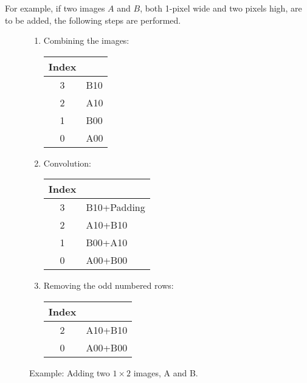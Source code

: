 \documentclass[12pt]{report}
\def\byX {\!\!\times\!\!}
\begin{document}
For example, if two images $A$ and $B$, both 1-pixel wide and two
pixels high, are to be added, the following steps are performed.
\begin{figure}[H]
\begin{mdframed}[style=default]
\begin{enumerate}
\item Combining the images:
\begin{center}
\begin{tabular}{cl}
Index &\ \\
\hline
3 & B10\\
2 & A10\\
1 & B00\\
0 & A00\\
\end{tabular}
\end{center}

\item Convolution:
\begin{center}
\begin{tabular}{cl}
Index &\ \\
\hline
3 & B10+Padding\\
2 & A10+B10\\
1 & B00+A10\\
0 & A00+B00\\
\end{tabular}
\end{center}

\item Removing the odd numbered rows:
\begin{center}
\begin{tabular}{cl}
Index &\ \\
\hline
2 & A10+B10\\
0 & A00+B00\\
\end{tabular}
\end{center}
\end{enumerate}
\end{mdframed}
\caption{Example: Adding two $1\byX 2$ images, A and B.}
\end{figure}
\end{document}
